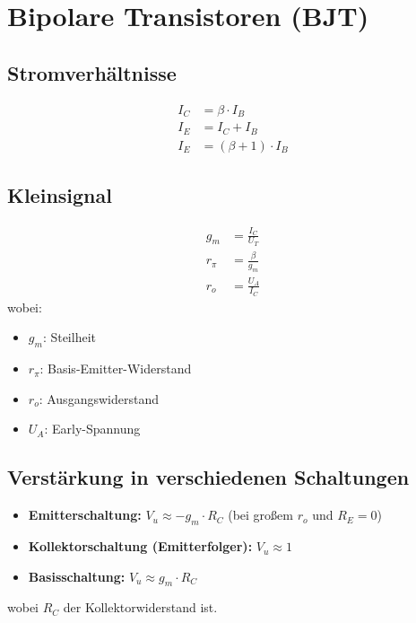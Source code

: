 \documentclass{article}
\begin{document}
\section*{Bipolare Transistoren (BJT)}
\begin{minipage}[t]{0.5\textwidth}
    \subsection*{Stromverhältnisse}
        \begin{align*}
            I_C &= \beta \cdot I_B \\
            I_E &= I_C + I_B \\
            I_E &= (\beta + 1) \cdot I_B
        \end{align*}
    
\end{minipage}%
\begin{minipage}[t]{0.5\textwidth}
\subsection*{Kleinsignal}
    \begin{align*}
        g_m &= \frac{I_C}{U_T} \\
        r_\pi &= \frac{\beta}{g_m} \\
        r_o &= \frac{U_A}{I_C}
    \end{align*}
    wobei:
    \begin{itemize}
        \item $g_m$: Steilheit
        \item $r_\pi$: Basis-Emitter-Widerstand
        \item $r_o$: Ausgangswiderstand
        \item $U_A$: Early-Spannung
    \end{itemize}
\end{minipage}
\subsection*{Verstärkung in verschiedenen Schaltungen}
\begin{itemize}
    \item \textbf{Emitterschaltung:} $V_u \approx -g_m \cdot R_C$ (bei großem $r_o$ und $R_E = 0$)
    \item \textbf{Kollektorschaltung (Emitterfolger):} $V_u \approx 1$
    \item \textbf{Basisschaltung:} $V_u \approx g_m \cdot R_C$
\end{itemize}
wobei $R_C$ der Kollektorwiderstand ist.
\end{document}
